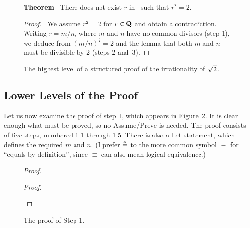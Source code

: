 \begin{figure}
\small
{\bf Theorem} \ There does not exist $r$ in \Q\ such that $r^{2}=2$.
\begin{proof}
\pfsketch\ We assume $r^{2}=2$ for $r\in{\bf Q}$ and obtain a contradiction.
Writing $r=m/n$, where $m$ and $n$ have no common divisors (step 1),
we deduce from $(m/n)^{2}=2$  and the lemma that both $m$ and $n$
must be divisible by 2 (steps 2 and~3).



\qedstep
\end{proof}
\normalsize
\caption{The highest level of a structured proof of the irrationality
         of $\protect\sqrt{2}$.}
\label{fig:high-level-proof}
\end{figure}




\subsection{Lower Levels of the Proof}

Let us now examine the proof of step 1, which appears in
Figure~\ref{fig:step1}.  It is clear enough what must be proved, so no
{\sc Assume}/{\sc Prove} is needed.  The proof consists of five steps,
numbered 1.1 through 1.5.  There is also a {\sc Let} statement, which
defines the required $m$ and $n$.  (I prefer $\mathrel{\stackrel{\scriptscriptstyle\Delta}{=}}$ to the more common
symbol $\equiv$ for ``equals by definition'', since $\equiv$
can also mean logical equivalence.)

\begin{figure}
\small
\begin{proof}
\begin{proof}
\qedstep
\end{proof}
\end{proof}
\normalsize
\caption{The proof of Step 1.}
\label{fig:step1}
\end{figure}

